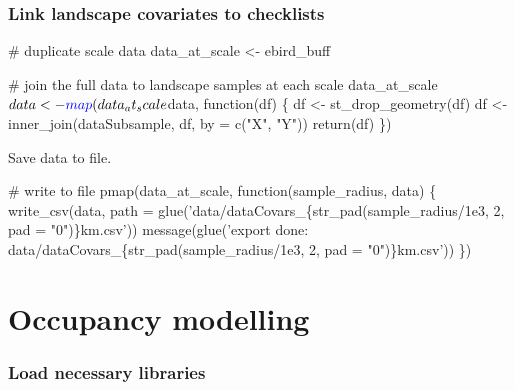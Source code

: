 \documentclass[]{article}
\newenvironment{Shaded}{}{}
\newcommand{\CommentTok}[1]{\textcolor[rgb]{0.00,0.50,0.00}{#1}}
\newcommand{\ControlFlowTok}[1]{\textcolor[rgb]{0.00,0.00,1.00}{#1}}
\newcommand{\DataTypeTok}[1]{#1}
\newcommand{\KeywordTok}[1]{\textcolor[rgb]{0.00,0.00,1.00}{#1}}
\newcommand{\NormalTok}[1]{#1}
\newcommand{\OperatorTok}[1]{#1}
\newcommand{\StringTok}[1]{\textcolor[rgb]{0.00,0.50,0.50}{#1}}
\begin{document}
\hypertarget{link-landscape-covariates-to-checklists}{%
\subsubsection{Link landscape covariates to checklists}\label{link-landscape-covariates-to-checklists}}

\begin{Shaded}
\begin{Highlighting}[]
\CommentTok{# duplicate scale data}
\NormalTok{data_at_scale <-}\StringTok{ }\NormalTok{ebird_buff}

\CommentTok{# join the full data to landscape samples at each scale}
\NormalTok{data_at_scale}\OperatorTok{$}\NormalTok{data <-}\StringTok{ }\KeywordTok{map}\NormalTok{(data_at_scale}\OperatorTok{$}\NormalTok{data, }\ControlFlowTok{function}\NormalTok{(df) \{}
\NormalTok{  df <-}\StringTok{ }\KeywordTok{st_drop_geometry}\NormalTok{(df)}
\NormalTok{  df <-}\StringTok{ }\KeywordTok{inner_join}\NormalTok{(dataSubsample, df, }\DataTypeTok{by =} \KeywordTok{c}\NormalTok{(}\StringTok{"X"}\NormalTok{, }\StringTok{"Y"}\NormalTok{))}
  \KeywordTok{return}\NormalTok{(df)}
\NormalTok{\})}
\end{Highlighting}
\end{Shaded}

Save data to file.

\begin{Shaded}
\begin{Highlighting}[]
\CommentTok{# write to file}
\KeywordTok{pmap}\NormalTok{(data_at_scale, }\ControlFlowTok{function}\NormalTok{(sample_radius, data) \{}
  \KeywordTok{write_csv}\NormalTok{(data, }\DataTypeTok{path =} \KeywordTok{glue}\NormalTok{(}\StringTok{'data/dataCovars_\{str_pad(sample_radius/1e3, 2, pad = "0")\}km.csv'}\NormalTok{))}
  \KeywordTok{message}\NormalTok{(}\KeywordTok{glue}\NormalTok{(}\StringTok{'export done: data/dataCovars_\{str_pad(sample_radius/1e3, 2, pad = "0")\}km.csv'}\NormalTok{))}
\NormalTok{\})}
\end{Highlighting}
\end{Shaded}

\hypertarget{occupancy-modelling}{%
\section{Occupancy modelling}\label{occupancy-modelling}}

\hypertarget{load-necessary-libraries}{%
\subsubsection{Load necessary libraries}\label{load-necessary-libraries}}
\end{document}

